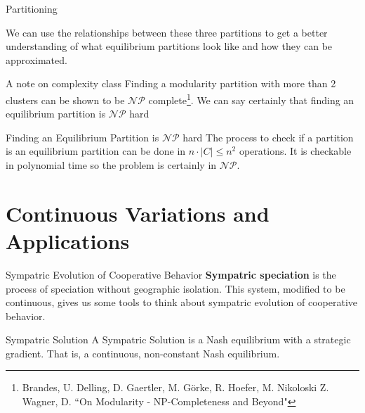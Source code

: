 \documentclass{beamer}
\begin{document}
\begin{frame}{Partitioning}
	\begin{figure}
			\centering
	\end{figure}
	We can use the relationships between these three partitions to get a better understanding of what equilibrium partitions look like and how they can be approximated. 
\end{frame}

\begin{frame}
	{A note on complexity class}
	 Finding a modularity partition with more than 2 clusters can be shown to be $\mathcal{NP}$ complete\footnote{Brandes, U. Delling, D. Gaertler, M. G\"orke, R. Hoefer, M. Nikoloski Z. Wagner, D. ``On Modularity - NP-Completeness and Beyond"}. We can say certainly that finding an equilibrium partition is $\mathcal{NP}$ hard
	\begin{block}{Finding an Equilibrium Partition is $\mathcal{NP}$ hard}
		The process to check if a partition is an equilibrium partition can be done in $n\cdot |C|\leq n^2$ operations. It is checkable in polynomial time so the problem is certainly in $\mathcal{NP}$. 
	\end{block}
\end{frame}
\section{Continuous Variations and Applications}
\begin{frame}{Sympatric Evolution of Cooperative Behavior}
	\textbf{Sympatric speciation} is the process of speciation without geographic isolation.  This system, modified to be continuous, gives us some tools to think about sympatric evolution of cooperative behavior. 
	
	\begin{block}{Sympatric Solution}
		A Sympatric Solution is a Nash equilibrium with a strategic gradient. That is, a continuous, non-constant Nash equilibrium. 
	\end{block}
\end{frame}
\end{document}
